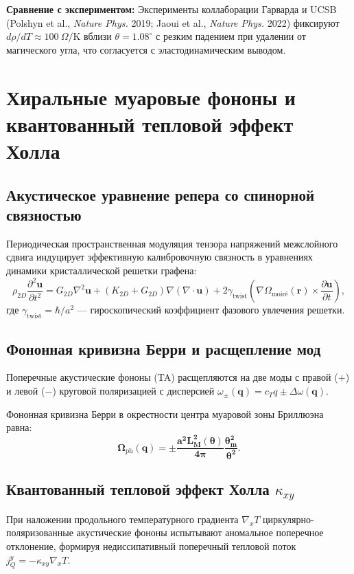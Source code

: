 \documentclass[12pt,a4paper]{article}
\begin{document}
\textbf{Сравнение с экспериментом:} Эксперименты коллаборации Гарварда и UCSB (Polshyn et al., \textit{Nature Phys.} 2019; Jaoui et al., \textit{Nature Phys.} 2022) фиксируют $d\rho/dT \approx 100 \ \Omega/\text{K}$ вблизи $\theta = 1.08^\circ$ с резким падением при удалении от магического угла, что согласуется с эластодинамическим выводом.

\section{Хиральные муаровые фононы и квантованный тепловой эффект Холла}

\subsection{Акустическое уравнение репера со спинорной связностью}
Периодическая пространственная модуляция тензора напряжений межслойного сдвига индуцирует эффективную калибровочную связность в уравнениях динамики кристаллической решетки графена:
\begin{equation}
	\rho_{2D} \frac{\partial^2 \mathbf{u}}{\partial t^2} = G_{2D} \nabla^2 \mathbf{u} + (K_{2D} + G_{2D}) \nabla(\nabla \cdot \mathbf{u}) + 2 \gamma_{\text{twist}} \left( \nabla \Omega_{\text{moir\'e}}(\mathbf{r}) \times \frac{\partial \mathbf{u}}{\partial t} \right),
\end{equation}
где $\gamma_{\text{twist}} = \hbar / a^2$ — гироскопический коэффициент фазового увлечения решетки.

\subsection{Фононная кривизна Берри и расщепление мод}
Поперечные акустические фононы (TA) расщепляются на две моды с правой ($+$) и левой ($-$) круговой поляризацией с дисперсией $\omega_\pm(\mathbf{q}) = c_T q \pm \Delta\omega(\mathbf{q})$. 

Фононная кривизна Берри в окрестности центра муаровой зоны Бриллюэна равна:
\begin{equation}
	\mathbf{\Omega_{\mathrm{ph}}(\mathbf{q}) = \pm \frac{a^2 L_M^2(\theta)}{4\pi} \frac{\theta_m^2}{\theta^2}}.
\end{equation}

\subsection{Квантованный тепловой эффект Холла $\kappa_{xy}$}
При наложении продольного температурного градиента $\nabla_x T$ циркулярно-поляризованные акустические фононы испытывают аномальное поперечное отклонение, формируя недиссипативный поперечный тепловой поток $j_Q^y = -\kappa_{xy} \nabla_x T$.
\end{document}
